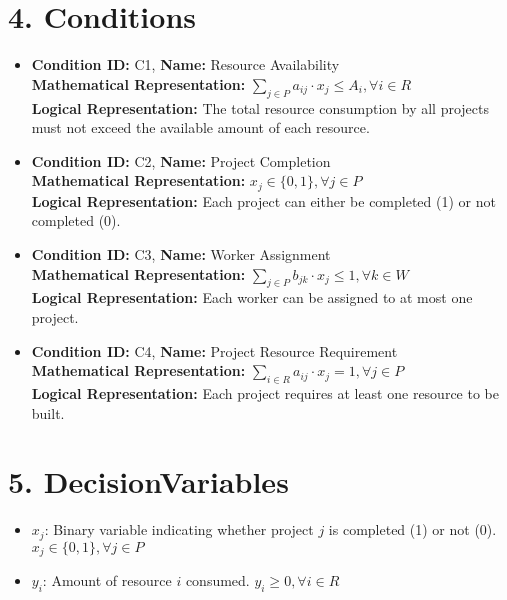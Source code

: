 \documentclass{article}
\begin{document}
\section{4. Conditions}

\begin{itemize}
    \item \textbf{Condition ID:} C1, \textbf{Name:} Resource Availability \\
    \textbf{Mathematical Representation:} $\sum_{j \in P} a_{ij} \cdot x_j \le A_i, \forall i \in R$ \\
    \textbf{Logical Representation:} The total resource consumption by all projects must not exceed the available amount of each resource.

    \item \textbf{Condition ID:} C2, \textbf{Name:} Project Completion \\
    \textbf{Mathematical Representation:} $x_j \in \{0, 1\}, \forall j \in P$ \\
    \textbf{Logical Representation:} Each project can either be completed (1) or not completed (0).

    \item \textbf{Condition ID:} C3, \textbf{Name:} Worker Assignment \\
    \textbf{Mathematical Representation:} $\sum_{j \in P} b_{jk} \cdot x_j \le 1, \forall k \in W$ \\
    \textbf{Logical Representation:}  Each worker can be assigned to at most one project.
    
    \item \textbf{Condition ID:} C4, \textbf{Name:} Project Resource Requirement \\
    \textbf{Mathematical Representation:} $\sum_{i \in R} a_{ij} \cdot x_j  = 1, \forall j \in P$ \\
    \textbf{Logical Representation:} Each project requires at least one resource to be built.

\end{itemize}

\section{5. DecisionVariables}

\begin{itemize}
    \item $x_j$: Binary variable indicating whether project $j$ is completed (1) or not (0).  $x_j \in \{0, 1\}, \forall j \in P$
    \item $y_i$:  Amount of resource $i$ consumed. $y_i \ge 0, \forall i \in R$
\end{itemize}
\end{document}
